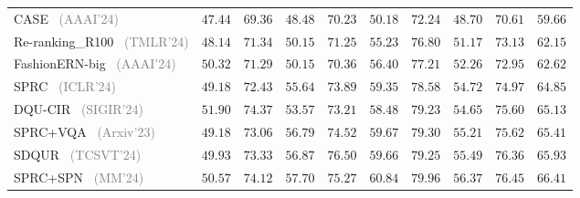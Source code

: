 \begin{table*}
\begin{tabular}{l|cc|cc|cc|cc|c}
    CASE~\cite{levy2024case} \footnotesize{\textcolor{gray}{(AAAI'24)}} & $47.44$ & $69.36$ & $48.48$ & $70.23$ & $50.18$ & $72.24$ & $48.70$ & $70.61$ & $59.66$ \\
    Re-ranking_R100~\cite{liu2023rerank} \footnotesize{\textcolor{gray}{(TMLR'24)}} & $48.14$ & $71.34$ & $50.15$ & $71.25$ & $55.23$ & $76.80$ & $51.17$ & $73.13$ & $62.15$ \\
    FashionERN-big~\cite{chen2024fashionern} \footnotesize{\textcolor{gray}{(AAAI'24)}} & $50.32$ & $71.29$ & $50.15$ & $70.36$ & $56.40$ & $77.21$ & $52.26$ & $72.95$ & $62.62$ \\
    SPRC~\cite{xusentence2024sprc} \footnotesize{\textcolor{gray}{(ICLR'24)}} & $49.18$ & $72.43$ & $55.64$ & $73.89$ & $59.35$ & $78.58$ & $54.72$ & $74.97$ & $64.85$ \\
    DQU-CIR~\cite{wen2024dqu} \footnotesize{\textcolor{gray}{(SIGIR'24)}} & $51.90$ & $74.37$ & $53.57$ & $73.21$ & $58.48$ & $79.23$ & $54.65$ & $75.60$ & $65.13$ \\
    SPRC+VQA~\cite{feng2023vqa4cir} \footnotesize{\textcolor{gray}{(Arxiv'23)}}& $49.18$ & $73.06$ & $56.79$ & $74.52$ & $59.67$ & $79.30$ & $55.21$ & $75.62$ & $65.41$ \\
    SDQUR~\cite{xu2024SDQUR} \footnotesize{\textcolor{gray}{(TCSVT'24)}} & $49.93$ & $73.33$ & $56.87$ & $76.50$ & $59.66$ & $79.25$ & $55.49$ & $76.36$ & $65.93$ \\
    SPRC+SPN~\cite{feng2024spn} \footnotesize{\textcolor{gray}{(MM'24)}} & $50.57$ & $74.12$ & $57.70$ & $75.27$ & $60.84$ & $79.96$ & $56.37$ & $76.45$ & $66.41$ \\
    \hline
    \end{tabular}
    \label{tab:supervised_CIR_exp_fashioniq_ori}
\end{table*}


